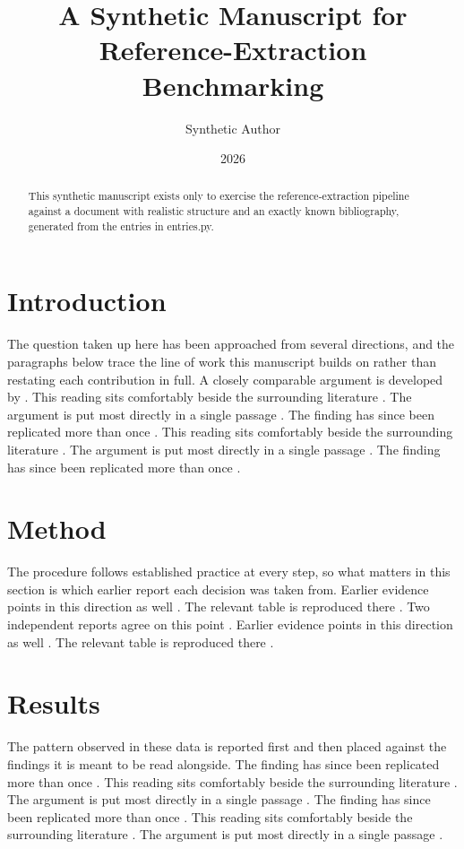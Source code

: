\documentclass{article}
\title{A Synthetic Manuscript for Reference-Extraction Benchmarking}
\author{Synthetic Author}
\date{2026}
\begin{document}
\maketitle

\begin{abstract}
This synthetic manuscript exists only to exercise the reference-extraction pipeline against a document with realistic structure and an exactly known bibliography, generated from the entries in entries.py.
\end{abstract}

\section{Introduction}
The question taken up here has been approached from several directions, and the paragraphs below trace the line of work this manuscript builds on rather than restating each contribution in full. A closely comparable argument is developed by \textcite{foucault1977discipline}. This reading sits comfortably beside the surrounding literature \parencite{kuhn1962structure}. The argument is put most directly in a single passage \parencite[p.~14]{said1978orientalism}. The finding has since been replicated more than once \parencite{barth1956churchdogmatics,gadamer1975truth}. This reading sits comfortably beside the surrounding literature \parencite{arendt1958human}. The argument is put most directly in a single passage \parencite[p.~14]{derrida1976grammatology}. The finding has since been replicated more than once \parencite{eliade1959sacred,ricoeur1969symbolism}.

\section{Method}
The procedure follows established practice at every step, so what matters in this section is which earlier report each decision was taken from. Earlier evidence points in this direction as well \parencite{bloom1973anxiety}. The relevant table is reproduced there \parencite[p.~87]{augustine1961confessions}. Two independent reports agree on this point \parencite{nietzsche1967genealogy,heidegger1962being}. Earlier evidence points in this direction as well \parencite{habermas1984theory}. The relevant table is reproduced there \parencite[p.~87]{bultmann1958jesus}.

\section{Results}
The pattern observed in these data is reported first and then placed against the findings it is meant to be read alongside. The finding has since been replicated more than once \parencite{tillich1951systematic,niebuhr1932moral}. This reading sits comfortably beside the surrounding literature \parencite{buber1970iandthou}. The argument is put most directly in a single passage \parencite[p.~14]{levinas1969totality}. The finding has since been replicated more than once \parencite{ricoeur1970freud,white1973metahistory}. This reading sits comfortably beside the surrounding literature \parencite{benjamin1968workofart}. The argument is put most directly in a single passage \parencite[p.~14]{adornohorkheimer2002dialectic}.
\end{document}
